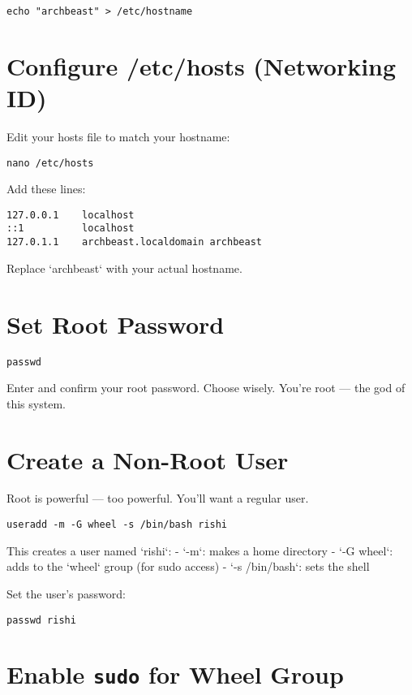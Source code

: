\documentclass[12pt]{book}
\begin{document}
\begin{lstlisting}
echo "archbeast" > /etc/hostname
\end{lstlisting}

\section{Configure /etc/hosts (Networking ID)}

Edit your hosts file to match your hostname:

\begin{lstlisting}
nano /etc/hosts
\end{lstlisting}

Add these lines:

\begin{lstlisting}
127.0.0.1    localhost
::1          localhost
127.0.1.1    archbeast.localdomain archbeast
\end{lstlisting}

Replace `archbeast` with your actual hostname.

\section{Set Root Password}

\begin{lstlisting}
passwd
\end{lstlisting}

Enter and confirm your root password. Choose wisely. You’re root — the god of this system.

\section{Create a Non-Root User}

Root is powerful — too powerful. You’ll want a regular user.

\begin{lstlisting}
useradd -m -G wheel -s /bin/bash rishi
\end{lstlisting}

This creates a user named `rishi`:
- `-m`: makes a home directory
- `-G wheel`: adds to the `wheel` group (for sudo access)
- `-s /bin/bash`: sets the shell

Set the user’s password:

\begin{lstlisting}
passwd rishi
\end{lstlisting}

\section{Enable \texttt{sudo} for Wheel Group}
\end{document}
